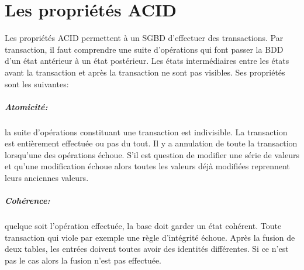 \chapter{Les propriétés \textsf{ACID}}\label{acid}
Les propriétés \textsf{ACID} permettent à un \textsf{SGBD} d'effectuer
des transactions. Par transaction, il faut comprendre une suite
d'opérations qui font passer la \textsf{BDD} d'un état antérieur à un
état postérieur. Les états intermédiaires entre les états avant la
transaction et après la transaction ne sont pas visibles. Ses
propriétés sont les suivantes:

\paragraph{Atomicité:} la suite d'opérations constituant une transaction 
est indivisible. La transaction est entièrement effectuée ou pas du tout. 
Il y a annulation de toute la transaction lorsqu'une des opérations échoue.
S'il est question de modifier une série de valeurs et qu'une modification
échoue alors toutes les valeurs déjà modifiées reprennent leurs anciennes
valeurs. 

\paragraph{Cohérence:} quelque soit l'opération effectuée, la base doit garder
un état cohérent. Toute transaction qui viole par exemple une règle d'intégrité 
échoue. Après la fusion de deux tables, les entrées doivent toutes 
avoir des identités différentes. Si ce n'est pas le cas alors la fusion n'est 
pas effectuée.

